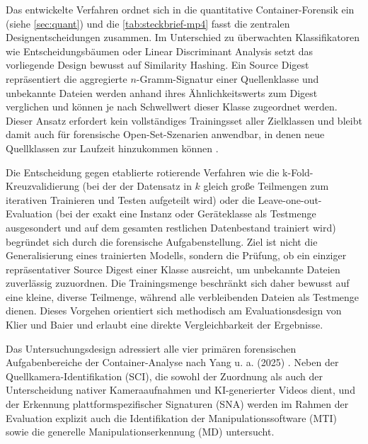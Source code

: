 Das entwickelte Verfahren ordnet sich in die quantitative Container-Forensik ein (siehe \cref{sec:quant}) und die  \cref{tab:steckbrief-mp4} fasst die zentralen Designentscheidungen zusammen. Im Unterschied zu überwachten Klassifikatoren wie Entscheidungsbäumen \cite[Kap.~5]{yang_efficient_2020} oder Linear Discriminant Analysis \cite[S.~1045]{xiang_forensic_2021} setzt das vorliegende Design bewusst auf Similarity Hashing. Ein Source Digest repräsentiert die aggregierte \(n\)-Gramm-Signatur einer Quellenklasse und unbekannte Dateien werden anhand ihres Ähnlichkeitswerts zum Digest verglichen und können je nach Schwellwert dieser Klasse zugeordnet werden. Dieser Ansatz erfordert kein vollständiges Trainingsset aller Zielklassen und bleibt damit auch für forensische Open-Set-Szenarien anwendbar, in denen neue Quellklassen zur Laufzeit hinzukommen können \cite[Kap.~1]{klier_media_2025}.

Die Entscheidung gegen etablierte rotierende Verfahren wie die k-Fold-Kreuzvalidierung (bei der der Datensatz in $k$ gleich große Teilmengen zum iterativen Trainieren und Testen aufgeteilt wird) oder die Leave-one-out-Evaluation (bei der exakt eine Instanz oder Geräteklasse als Testmenge ausgesondert und auf dem gesamten restlichen Datenbestand trainiert wird) begründet sich durch die forensische Aufgabenstellung. Ziel ist nicht die Generalisierung eines trainierten Modells, sondern die Prüfung, ob ein einziger repräsentativer Source Digest einer Klasse ausreicht, um unbekannte Dateien zuverlässig zuzuordnen. Die Trainingsmenge beschränkt sich daher bewusst auf eine kleine, diverse Teilmenge, während alle verbleibenden Dateien als Testmenge dienen. Dieses Vorgehen orientiert sich methodisch am Evaluationsdesign von Klier und Baier \cite[Kap.~3]{klier_media_2025} und erlaubt eine direkte Vergleichbarkeit der Ergebnisse.

Das Untersuchungsdesign adressiert alle vier primären forensischen Aufgabenbereiche der Container-Analyse nach Yang u. a. (2025) \cite[Kap.~5.4]{yang_comprehensive_2025}. Neben der Quellkamera-Identifikation (SCI), die sowohl der Zuordnung als auch der Unterscheidung nativer Kameraaufnahmen und KI-generierter Videos dient, und der Erkennung plattformspezifischer Signaturen (SNA) werden im Rahmen der Evaluation explizit auch die Identifikation der Manipulationssoftware (MTI) sowie die generelle Manipulationserkennung (MD) untersucht.